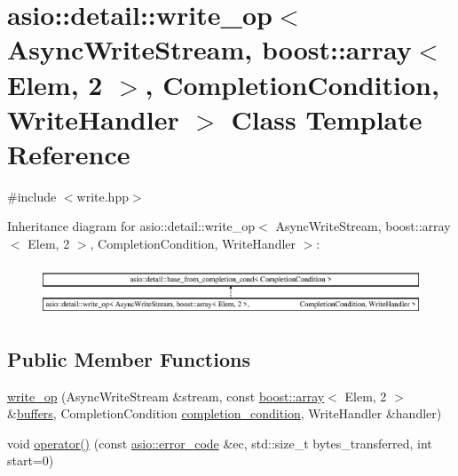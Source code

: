 \hypertarget{classasio_1_1detail_1_1write__op_3_01_async_write_stream_00_01boost_1_1array_3_01_elem_00_012_018cbe26fbc46920cd28943bf9ace97230}{}\section{asio\+:\+:detail\+:\+:write\+\_\+op$<$ Async\+Write\+Stream, boost\+:\+:array$<$ Elem, 2 $>$, Completion\+Condition, Write\+Handler $>$ Class Template Reference}
\label{classasio_1_1detail_1_1write__op_3_01_async_write_stream_00_01boost_1_1array_3_01_elem_00_012_018cbe26fbc46920cd28943bf9ace97230}


{\ttfamily \#include $<$write.\+hpp$>$}

Inheritance diagram for asio\+:\+:detail\+:\+:write\+\_\+op$<$ Async\+Write\+Stream, boost\+:\+:array$<$ Elem, 2 $>$, Completion\+Condition, Write\+Handler $>$\+:\begin{figure}[H]
\begin{center}
\leavevmode
\includegraphics[height=1.511471cm]{classasio_1_1detail_1_1write__op_3_01_async_write_stream_00_01boost_1_1array_3_01_elem_00_012_018cbe26fbc46920cd28943bf9ace97230}
\end{center}
\end{figure}
\subsection*{Public Member Functions}
\begin{DoxyCompactItemize}
\item 
\hyperlink{classasio_1_1detail_1_1write__op_3_01_async_write_stream_00_01boost_1_1array_3_01_elem_00_012_018cbe26fbc46920cd28943bf9ace97230_a74e3ea27274739e5378777abab0ba9b0}{write\+\_\+op} (Async\+Write\+Stream \&stream, const \hyperlink{classboost_1_1array}{boost\+::array}$<$ Elem, 2 $>$ \&\hyperlink{group__async__read_ga54dede45c3175148a77fe6635222c47d}{buffers}, Completion\+Condition \hyperlink{group__async__read_gae2e215d5013596cc2b385bb6c13fa518}{completion\+\_\+condition}, Write\+Handler \&handler)
\item 
void \hyperlink{classasio_1_1detail_1_1write__op_3_01_async_write_stream_00_01boost_1_1array_3_01_elem_00_012_018cbe26fbc46920cd28943bf9ace97230_aacd57d8a69d7d0496d0bbd7fab2fd41e}{operator()} (const \hyperlink{classasio_1_1error__code}{asio\+::error\+\_\+code} \&ec, std\+::size\+\_\+t bytes\+\_\+transferred, int start=0)
\end{DoxyCompactItemize}
